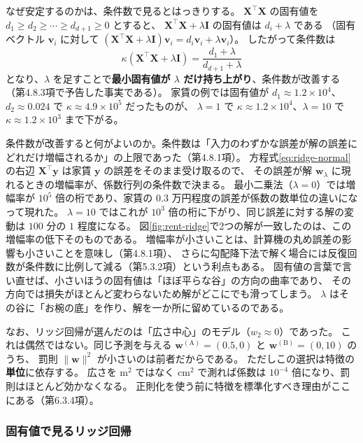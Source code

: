 なぜ安定するのかは、条件数で見るとはっきりする。
$\bm{X}^\top\bm{X}$ の固有値を $d_1 \geq d_2 \geq \cdots \geq d_{d+1} \geq 0$ とすると、
$\bm{X}^\top\bm{X} + \lambda\bm{I}$ の固有値は $d_i + \lambda$ である
（固有ベクトル $\bm{v}_i$ に対して $(\bm{X}^\top\bm{X} + \lambda\bm{I})\bm{v}_i = d_i\bm{v}_i + \lambda\bm{v}_i$）。
したがって条件数は
\begin{equation}
  \kappa(\bm{X}^\top\bm{X} + \lambda\bm{I}) = \frac{d_1 + \lambda}{d_{d+1} + \lambda}
  \label{eq:ridge-kappa}
\end{equation}
となり、$\lambda$ を足すことで\textbf{最小固有値が $\lambda$ だけ持ち上がり}、条件数が改善する（第4.8.3項で予告した事実である）。
家賃の例では固有値が $d_1 \approx 1.2 \times 10^4$、$d_2 \approx 0.024$ で $\kappa \approx 4.9 \times 10^5$ だったものが、
$\lambda = 1$ で $\kappa \approx 1.2 \times 10^4$、$\lambda = 10$ で $\kappa \approx 1.2 \times 10^3$ まで下がる。

条件数が改善すると何がよいのか。条件数は「入力のわずかな誤差が解の誤差にどれだけ増幅されるか」の上限であった（第4.8.1項）。
方程式\eqref{eq:ridge-normal}の右辺 $\bm{X}^\top\bm{y}$ は家賃 $\bm{y}$ の誤差をそのまま受け取るので、
その誤差が解 $\bm{w}_\lambda$ に現れるときの増幅率が、係数行列の条件数で決まる。
最小二乗法（$\lambda = 0$）では増幅率が $10^5$ 倍の桁であり、家賃の $0.3$ 万円程度の誤差が係数の数単位の違いになって現れた。
$\lambda = 10$ ではこれが $10^3$ 倍の桁に下がり、同じ誤差に対する解の変動は $100$ 分の $1$ 程度になる。
図\ref{fig:rent-ridge}で2つの解が一致したのは、この増幅率の低下そのものである。
増幅率が小さいことは、計算機の丸め誤差の影響も小さいことを意味し（第4.8.1項）、
さらに勾配降下法で解く場合には反復回数が条件数に比例して減る（第5.3.2項）という利点もある。
固有値の言葉で言い直せば、小さいほうの固有値は「ほぼ平らな谷」の方向の曲率であり、
その方向では損失がほとんど変わらないため解がどこにでも滑ってしまう。
$\lambda$ はその谷に「お椀の底」を作り、解を一か所に留めているのである。

なお、リッジ回帰が選んだのは「広さ中心」のモデル（$w_2 \approx 0$）であった。
これは偶然ではない。同じ予測を与える $\bm{w}^{(\mathrm{A})} = (0.5, 0)$ と $\bm{w}^{(\mathrm{B})} = (0, 10)$ のうち、
罰則 $\|\bm{w}\|^2$ が小さいのは前者だからである。
ただしこの選択は特徴の\textbf{単位}に依存する。
広さを $\mathrm{m}^2$ ではなく $\mathrm{cm}^2$ で測れば係数は $10^{-4}$ 倍になり、罰則はほとんど効かなくなる。
正則化を使う前に特徴を標準化すべき理由がここにある（第6.3.4項）。

\subsubsection{固有値で見るリッジ回帰}

